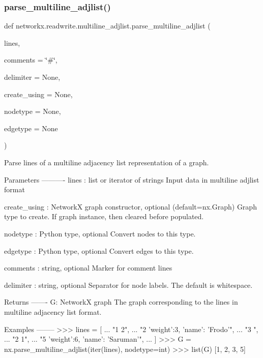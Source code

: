 \subsubsection{\texorpdfstring{parse\+\_\+multiline\+\_\+adjlist()}{parse\_multiline\_adjlist()}}
{\footnotesize\ttfamily def networkx.\+readwrite.\+multiline\+\_\+adjlist.\+parse\+\_\+multiline\+\_\+adjlist (\begin{DoxyParamCaption}\item[{}]{lines,  }\item[{}]{comments = {\ttfamily \char`\"{}\#\char`\"{}},  }\item[{}]{delimiter = {\ttfamily None},  }\item[{}]{create\+\_\+using = {\ttfamily None},  }\item[{}]{nodetype = {\ttfamily None},  }\item[{}]{edgetype = {\ttfamily None} }\end{DoxyParamCaption})}

\begin{DoxyVerb}Parse lines of a multiline adjacency list representation of a graph.

Parameters
----------
lines : list or iterator of strings
    Input data in multiline adjlist format

create_using : NetworkX graph constructor, optional (default=nx.Graph)
   Graph type to create. If graph instance, then cleared before populated.

nodetype : Python type, optional
   Convert nodes to this type.

edgetype : Python type, optional
   Convert edges to this type.

comments : string, optional
   Marker for comment lines

delimiter : string, optional
   Separator for node labels.  The default is whitespace.

Returns
-------
G: NetworkX graph
    The graph corresponding to the lines in multiline adjacency list format.

Examples
--------
>>> lines = [
...     "1 2",
...     "2 {'weight':3, 'name': 'Frodo'}",
...     "3 {}",
...     "2 1",
...     "5 {'weight':6, 'name': 'Saruman'}",
... ]
>>> G = nx.parse_multiline_adjlist(iter(lines), nodetype=int)
>>> list(G)
[1, 2, 3, 5]\end{DoxyVerb}
 \mbox{\label{namespacenetworkx_1_1readwrite_1_1multiline__adjlist_abf57e1a57f1d37fbbfea32c1da23cb7d}} 
